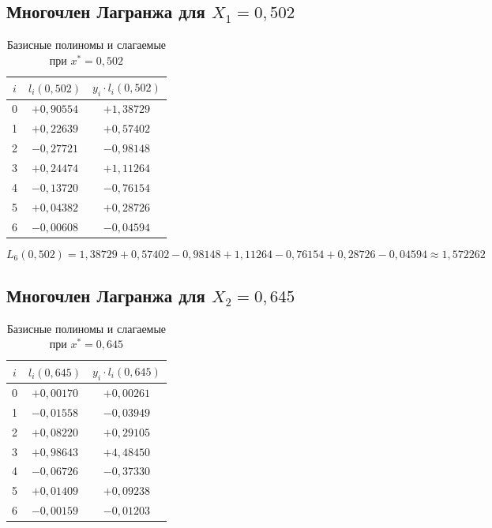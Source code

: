 \documentclass[a4paper,12pt]{article}
\begin{document}
\subsection{Многочлен Лагранжа для \texorpdfstring{$X_1=0{,}502$}{X1=0.502}}

\begin{table}[H]
\centering
\caption{Базисные полиномы и слагаемые при $x^*=0{,}502$}
\begin{tabular}{ccc}
\toprule
$i$ & $l_i(0{,}502)$ & $y_i\cdot l_i(0{,}502)$ \\
\midrule
0 & $+0{,}90554$ & $+1{,}38729$ \\
1 & $+0{,}22639$ & $+0{,}57402$ \\
2 & $-0{,}27721$ & $-0{,}98148$ \\
3 & $+0{,}24474$ & $+1{,}11264$ \\
4 & $-0{,}13720$ & $-0{,}76154$ \\
5 & $+0{,}04382$ & $+0{,}28726$ \\
6 & $-0{,}00608$ & $-0{,}04594$ \\
\bottomrule
\end{tabular}
\end{table}

\[
  L_6(0{,}502)=1{,}38729+0{,}57402-0{,}98148+1{,}11264-0{,}76154+0{,}28726-0{,}04594
  \approx\boxed{1{,}572262}
\]

\subsection{Многочлен Лагранжа для \texorpdfstring{$X_2=0{,}645$}{X2=0.645}}

\begin{table}[H]
\centering
\caption{Базисные полиномы и слагаемые при $x^*=0{,}645$}
\begin{tabular}{ccc}
\toprule
$i$ & $l_i(0{,}645)$ & $y_i\cdot l_i(0{,}645)$ \\
\midrule
0 & $+0{,}00170$ & $+0{,}00261$ \\
1 & $-0{,}01558$ & $-0{,}03949$ \\
2 & $+0{,}08220$ & $+0{,}29105$ \\
3 & $+0{,}98643$ & $+4{,}48450$ \\
4 & $-0{,}06726$ & $-0{,}37330$ \\
5 & $+0{,}01409$ & $+0{,}09238$ \\
6 & $-0{,}00159$ & $-0{,}01203$ \\
\bottomrule
\end{tabular}
\end{table}
\end{document}
